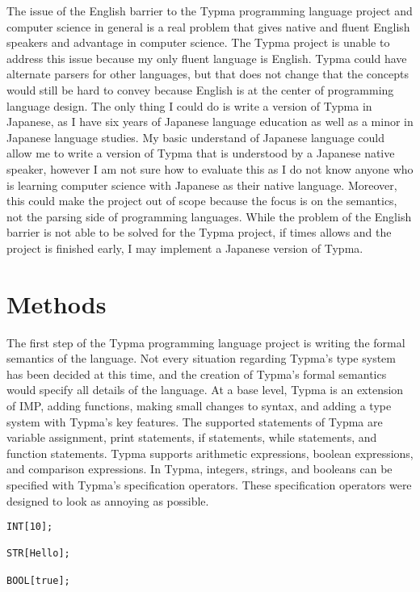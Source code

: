 \documentclass[10pt,twocolumn]{article}
\begin{document}
The issue of the English barrier to the Typma programming language project and computer science in general is a real problem that gives native and fluent English speakers and advantage in computer science. The Typma project is unable to address this issue because my only fluent language is English. Typma could have alternate parsers for other languages, but that does not change that the concepts would still be hard to convey because English is at the center of programming language design. The only thing I could do is write a version of Typma in Japanese, as I have six years of Japanese language education as well as a minor in Japanese language studies. My basic understand of Japanese language could allow me to write a version of Typma that is understood by a Japanese native speaker, however I am not sure how to evaluate this as I do not know anyone who is learning computer science with Japanese as their native language. Moreover, this could make the project out of scope because the focus is on the semantics, not the parsing side of programming languages. While the problem of the English barrier is not able to be solved for the Typma project, if times allows and the project is finished early, I may implement a Japanese version of Typma.

\section{Methods}

The first step of the Typma programming language project is writing the formal semantics of the language. Not every situation regarding Typma's type system has been decided at this time, and the creation of Typma's formal semantics would specify all details of the language. At a base level, Typma is an extension of IMP, adding functions, making small changes to syntax, and adding a type system with Typma's key features. The supported statements of Typma are variable assignment, print statements, if statements, while statements, and function statements. Typma supports arithmetic expressions, boolean expressions, and comparison expressions. In Typma, integers, strings, and booleans can be specified with Typma's specification operators. These specification operators were designed to look as annoying as possible.

\begin{lstlisting}
INT[10];

STR[Hello];

BOOL[true];
\end{lstlisting}
\end{document}
